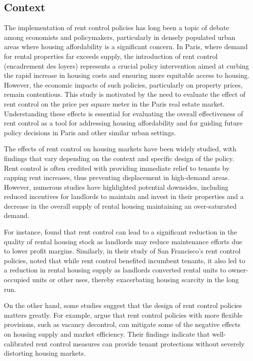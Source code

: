 \documentclass[12pt]{article}
\theoremstyle{plain}
\theoremstyle{remark}
\begin{document}
\subsection{Context}
The implementation of rent control policies has long been a topic of debate among economists and policymakers, particularly in densely populated urban areas where housing affordability is a significant concern. In Paris, where demand for rental properties far exceeds supply, the introduction of rent control (encadrement des loyers) represents a crucial policy intervention aimed at curbing the rapid increase in housing costs and ensuring more equitable access to housing. However, the economic impacts of such policies, particularly on property prices, remain contentious. This study is motivated by the need to evaluate the effect of rent control on the price per square meter in the Paris real estate market. Understanding these effects is essential for evaluating the overall effectiveness of rent control as a tool for addressing housing affordability and for guiding future policy decisions in Paris and other similar urban settings.

The effects of rent control on housing markets have been widely studied, with findings that vary depending on the context and specific design of the policy. Rent control is often credited with providing immediate relief to tenants by capping rent increases, thus preventing displacement in high-demand areas. However, numerous studies have highlighted potential downsides, including reduced incentives for landlords to maintain and invest in their properties and a decrease in the overall supply of rental housing maintaining an over-saturated demand.

For instance, \textcite{glaeser2003misallocation} found that rent control can lead to a significant reduction in the quality of rental housing stock as landlords may reduce maintenance efforts due to lower profit margins. Similarly, \textcite{diamond2019effects} in their study of San Francisco’s rent control policies, noted that while rent control benefited incumbent tenants, it also led to a reduction in rental housing supply as landlords converted rental units to owner-occupied units or other uses, thereby exacerbating housing scarcity in the long run.

On the other hand, some studies suggest that the design of rent control policies matters greatly. For example, \textcite{autor2014housing} argue that rent control policies with more flexible provisions, such as vacancy decontrol, can mitigate some of the negative effects on housing supply and market efficiency. Their findings indicate that well-calibrated rent control measures can provide tenant protections without severely distorting housing markets.
\end{document}

